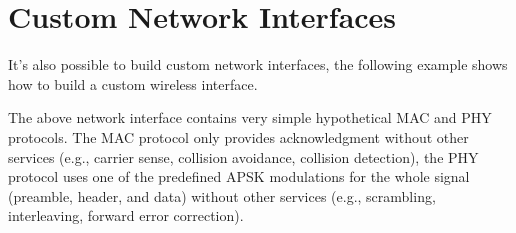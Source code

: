 \section{Custom Network Interfaces}

It's also possible to build custom network interfaces, the following
example shows how to build a custom wireless interface.


The above network interface contains very simple hypothetical MAC and PHY
protocols. The MAC protocol only provides acknowledgment without other
services (e.g., carrier sense, collision avoidance, collision detection),
the PHY protocol uses one of the predefined APSK modulations for the whole
signal (preamble, header, and data) without other services (e.g.,
scrambling, interleaving, forward error correction).




